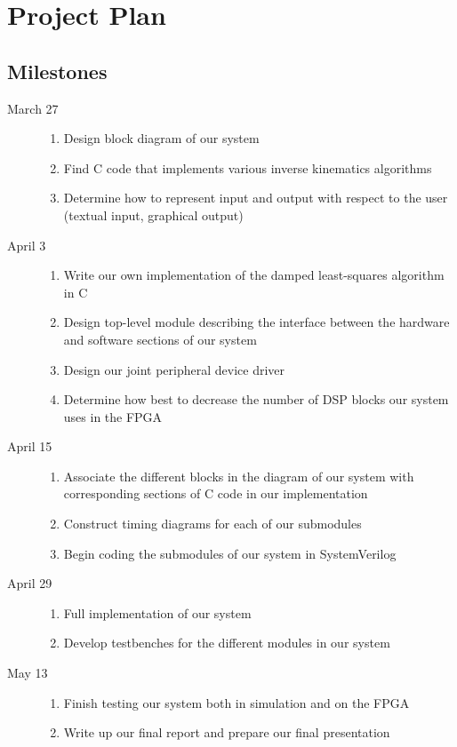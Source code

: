 \section{Project Plan}

\subsection{Milestones}

\begin{description}
\item[March 27] \hfill
\begin{enumerate}
\item Design block diagram of our system
\item Find C code that implements various inverse kinematics algorithms
\item Determine how to represent input and output with respect to the user (textual input, graphical output)
\end{enumerate}

\item[April 3] \hfill
\begin{enumerate}
\item Write our own implementation of the damped least-squares algorithm in C
\item Design top-level module describing the interface between the hardware and software sections of our system
\item Design our joint peripheral device driver
\item Determine how best to decrease the number of DSP blocks our system uses in the FPGA
\end{enumerate}


\item[April 15] \hfill 
\begin{enumerate}
\item Associate the different blocks in the diagram of our system with corresponding sections of C code in our implementation
\item Construct timing diagrams for each of our submodules
\item Begin coding the submodules of our system in SystemVerilog
\end{enumerate}

\item[April 29] \hfill 
\begin{enumerate}
\item Full implementation of our system
\item Develop testbenches for the different modules in our system
\end{enumerate}

\item[May 13] \hfill
\begin{enumerate}
\item Finish testing our system both in simulation and on the FPGA
\item Write up our final report and prepare our final presentation
\end{enumerate}

\end{description}

%
%
%
%
%

